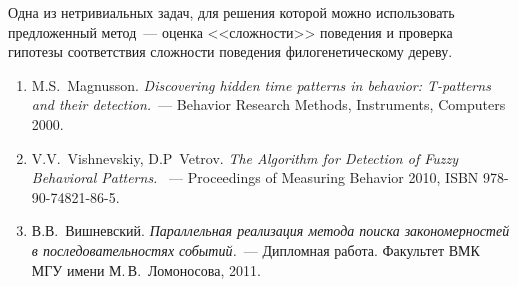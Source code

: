 Одна из нетривиальных задач, для решения которой можно использовать предложенный метод~---
оценка <<сложности>> поведения и проверка гипотезы соответствия сложности 
поведения филогенетическому дереву. 



\References
\begin{enumerate}
\item
    M.S.~Magnusson. \emph{Discovering hidden time patterns in behavior:
T-patterns and their detection.}~--- Behavior Research Methods, Instruments, Computers
2000.

\item
    V.V.~Vishnevskiy, D.P~Vetrov. \emph{The Algorithm for Detection of Fuzzy Behavioral Patterns.}
~--- Proceedings of Measuring Behavior 2010, ISBN 978-90-74821-86-5.

\item
    В.В.~Вишневский. \emph{Параллельная реализация метода поиска закономерностей в
последовательностях событий.}~--- Дипломная работа. Факультет ВМК МГУ имени М.\,В.~Ломоносова, 2011.

% 

\end{enumerate}

